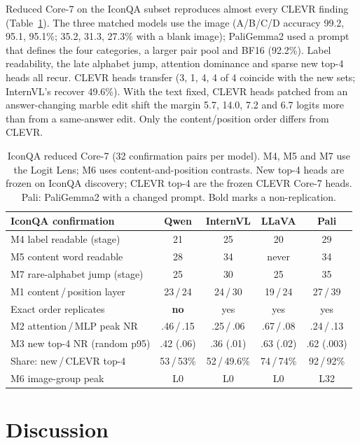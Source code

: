 \documentclass[11pt]{article}
\newcommand{\nr}{\mathrm{NR}}
\begin{document}
Reduced Core-7 on the IconQA subset reproduces almost every CLEVR finding (Table~\ref{tab:iconqa}). The three matched models use the image (A/B/C/D accuracy 99.2, 95.1, 95.1\%; 35.2, 31.3, 27.3\% with a blank image); PaliGemma2 used a prompt that defines the four categories, a larger pair pool and BF16 (92.2\%). Label readability, the late alphabet jump, attention dominance and sparse new top-4 heads all recur. CLEVR heads transfer (3, 1, 4, 4 of 4 coincide with the new sets; InternVL's recover 49.6\%). With the text fixed, CLEVR heads patched from an answer-changing marble edit shift the margin 5.7, 14.0, 7.2 and 6.7 logits more than from a same-answer edit. Only the content/position order differs from CLEVR.

\begin{table}[t]
\centering
\scriptsize
\setlength{\tabcolsep}{3pt}
\begin{tabularx}{\columnwidth}{@{}>{\raggedright\arraybackslash}X cccc@{}}
\toprule
IconQA confirmation & Qwen & InternVL & LLaVA & Pali \\
\midrule
M4 label readable (stage) & 21 & 25 & 20 & 29 \\
M5 content word readable & 28 & 34 & never & 34 \\
M7 rare-alphabet jump (stage) & 25 & 30 & 25 & 35 \\
M1 content\,/\,position layer & 23\,/\,24 & 24\,/\,30 & 19\,/\,24 & 27\,/\,39 \\
Exact order replicates & \textbf{no} & yes & yes & yes \\
M2 attention\,/\,MLP peak $\nr$ & .46\,/\,.15 & .25\,/\,.06 & .67\,/\,.08 & .24\,/\,.13 \\
M3 new top-4 $\nr$ (random p95) & .42 (.06) & .36 (.01) & .63 (.02) & .62 (.003) \\
Share: new\,/\,CLEVR top-4 & 53\,/\,53\% & 52\,/\,49.6\% & 74\,/\,74\% & 92\,/\,92\% \\
M6 image-group peak & L0 & L0 & L0 & L32 \\
\bottomrule
\end{tabularx}
\caption{IconQA reduced Core-7 (32 confirmation pairs per model). M4, M5 and M7 use the Logit Lens; M6 uses content-and-position contrasts. New top-4 heads are frozen on IconQA discovery; CLEVR top-4 are the frozen CLEVR Core-7 heads. Pali: PaliGemma2 with a changed prompt. Bold marks a non-replication.}
\label{tab:iconqa}
\end{table}

\section{Discussion}
\end{document}
